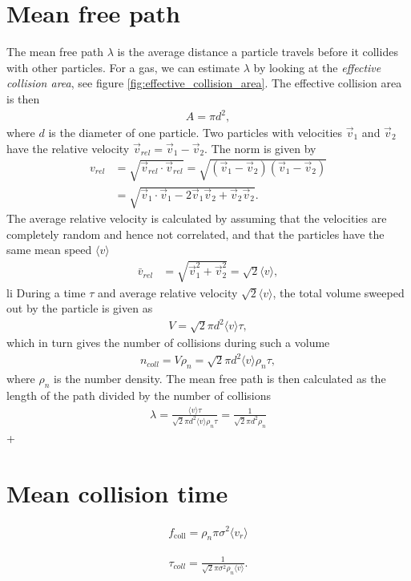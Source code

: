 \section{Mean free path}
\label{sec:mean_free_path_calculation}
The mean free path $\lambda$ is the average distance a particle travels before it collides with other particles. For a gas, we can estimate $\lambda$ by looking at the \textit{effective collision area}, see figure \ref{fig:effective_collision_area}. The effective collision area is then
\begin{align}
	A = \pi d^2,
\end{align}
where $d$ is the diameter of one particle. Two particles with velocities $\vec v_1$ and $\vec v_2$ have the relative velocity $\vec v_{rel} = \vec v_1 - \vec v_2$. The norm is given by
\begin{align}
	v_{rel} &= \sqrt{\vec v_{rel}\cdot \vec v_{rel} } = \sqrt{ (\vec v_1 - \vec v_2)(\vec v_1 - \vec v_2)}\\
	&= \sqrt{\vec v_1\cdot \vec v_1 - 2\vec v_1\vec v_2 + \vec v_2\vec v_2}.
\end{align}
The average relative velocity is calculated by assuming that the velocities are completely random and hence not correlated, and that the particles have the same mean speed $\langle v\rangle$
\begin{align}
	\bar v_{rel} &= \sqrt{\vec v_1^2 + \vec v_2^2} = \sqrt 2 \langle v\rangle,
\end{align}li
During a time $\tau$ and average relative velocity $\sqrt 2 \langle v\rangle$, the total volume sweeped out by the particle is given as
\begin{align}
	V = \sqrt 2 \pi d^2\langle v\rangle \tau,
\end{align}
which in turn gives the number of collisions during such a volume
\begin{align}
	\label{eq:num_collisions}
	n_{coll} = V\rho_n = \sqrt 2 \pi d^2\langle v\rangle \rho_n \tau,
\end{align}
where $\rho_n$ is the number density. The mean free path is then calculated as the length of the path divided by the number of collisions
\begin{align}
	\label{eq:mean_free_path}
	\lambda = \frac{\langle v\rangle \tau}{ \sqrt 2 \pi d^2\langle v\rangle \rho_n\tau} = \frac{1 }{ \sqrt 2 \pi d^2 \rho_n}
\end{align}+
\section{Mean collision time}
\begin{align}
	\label{eq:coll_frequency}
	f_\text{coll} = \rho_n \pi \sigma^2 \langle v_r \rangle
\end{align}

\begin{align}
	\label{eq:kinetic_theory_mean_collision_time}
	\tau_{coll} = \frac{1}{\sqrt 2 \pi \sigma^2 \rho_n \langle v \rangle}.
\end{align}